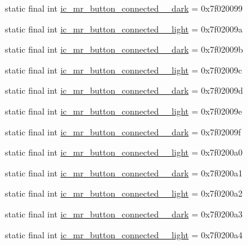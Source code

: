 \begin{CompactItemize}
static final int \hyperlink{classandroid_1_1support_1_1graphics_1_1drawable_1_1_r_1_1drawable_be019b9678f474021ff6757b8250583b}{ic\_\-mr\_\-button\_\-connected\_\_\-dark} = 0x7f020099
\item 
static final int \hyperlink{classandroid_1_1support_1_1graphics_1_1drawable_1_1_r_1_1drawable_f180c8bffe7dcd04ea47277c3795ba11}{ic\_\-mr\_\-button\_\-connected\_\_\-light} = 0x7f02009a
\item 
static final int \hyperlink{classandroid_1_1support_1_1graphics_1_1drawable_1_1_r_1_1drawable_96b076a2d6523946090c7cc692c07426}{ic\_\-mr\_\-button\_\-connected\_\_\-dark} = 0x7f02009b
\item 
static final int \hyperlink{classandroid_1_1support_1_1graphics_1_1drawable_1_1_r_1_1drawable_59e824e3c085155d85c95ce0c932ae84}{ic\_\-mr\_\-button\_\-connected\_\_\-light} = 0x7f02009c
\item 
static final int \hyperlink{classandroid_1_1support_1_1graphics_1_1drawable_1_1_r_1_1drawable_e89f79fa63b1770f83f81c743e06afa8}{ic\_\-mr\_\-button\_\-connected\_\_\-dark} = 0x7f02009d
\item 
static final int \hyperlink{classandroid_1_1support_1_1graphics_1_1drawable_1_1_r_1_1drawable_a2ac0ce18485df6a98a30a392e87b5e2}{ic\_\-mr\_\-button\_\-connected\_\_\-light} = 0x7f02009e
\item 
static final int \hyperlink{classandroid_1_1support_1_1graphics_1_1drawable_1_1_r_1_1drawable_26a282101de2c9553a54cda22c5892b0}{ic\_\-mr\_\-button\_\-connected\_\_\-dark} = 0x7f02009f
\item 
static final int \hyperlink{classandroid_1_1support_1_1graphics_1_1drawable_1_1_r_1_1drawable_53f0b1a034ecc1e439ecb3c8f9c8ee22}{ic\_\-mr\_\-button\_\-connected\_\_\-light} = 0x7f0200a0
\item 
static final int \hyperlink{classandroid_1_1support_1_1graphics_1_1drawable_1_1_r_1_1drawable_3ffe232ea48a7a4d1902bb0d3ba5d9c1}{ic\_\-mr\_\-button\_\-connected\_\_\-dark} = 0x7f0200a1
\item 
static final int \hyperlink{classandroid_1_1support_1_1graphics_1_1drawable_1_1_r_1_1drawable_8b2e43f6f35e22080f8c2a7854754adc}{ic\_\-mr\_\-button\_\-connected\_\_\-light} = 0x7f0200a2
\item 
static final int \hyperlink{classandroid_1_1support_1_1graphics_1_1drawable_1_1_r_1_1drawable_c9aada81d8f68936242f5ae2244385d5}{ic\_\-mr\_\-button\_\-connected\_\_\-dark} = 0x7f0200a3
\item 
static final int \hyperlink{classandroid_1_1support_1_1graphics_1_1drawable_1_1_r_1_1drawable_58a9b868fcbd7076292ece22d91fe714}{ic\_\-mr\_\-button\_\-connected\_\_\-light} = 0x7f0200a4

\end{CompactItemize}
